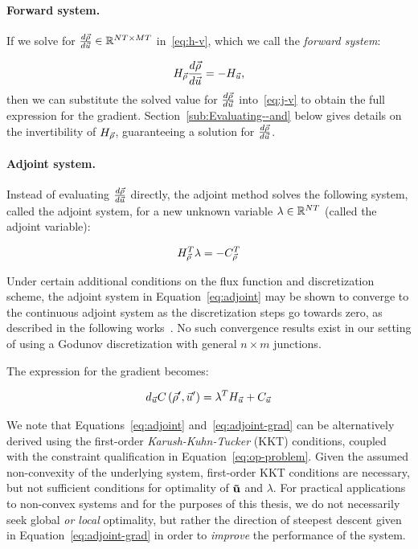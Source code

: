 \paragraph{Forward system.\label{par:Forward-system}}

If we solve for $\frac{d\vec{\rho}}{d\vec{u}}\in\mathbb{R}^{NT\times MT}$
in~\eqref{eq:h-v}, which we call the \emph{forward system}:

\[
H_{\vec{\rho}}\frac{d\vec{\rho}}{d\vec{u}}=-H_{\vec{u}},
\]
then we can substitute the solved value for $\frac{d\vec{\rho}}{d\vec{u}}$
into~\eqref{eq:j-v} to obtain the full expression for the gradient.
Section~\ref{sub:Evaluating--and} below gives details on the invertibility
of $H_{\vec{\rho}}$, guaranteeing a solution for $\frac{d\vec{\rho}}{d\vec{u}}$.


\paragraph{Adjoint system.\label{par:Adjoint-system}}

Instead of evaluating $\frac{d\vec{\rho}}{d\vec{u}}$ directly, the adjoint
method solves the following system, called the adjoint system,
for a new unknown variable $\lambda\in\mathbb{R}^{NT}$
(called the adjoint variable):

\begin{equation}
H_{\vec{\rho}}^{T}\lambda=-C_{\vec{\rho}}^{T}\label{eq:adjoint}
\end{equation}

Under certain additional conditions on the flux function and discretization scheme, the adjoint system in Equation~\eqref{eq:adjoint} may be shown to converge to the continuous adjoint system as the discretization steps go towards zero, as described in the following works~\cite{Banda2012Adjoint,Gugat2005,ulbrich2003adjoint}. No such convergence results exist in our setting of using a Godunov discretization with general $n\times m$ junctions.

The expression for the gradient becomes:

\begin{equation}
d_{\vec{u}}C\left(\vec{\rho}',\vec{u}'\right)=\lambda^{T}H_{\vec{u}}+C_{\vec{u}}\label{eq:adjoint-grad}
\end{equation}

We note that Equations~\eqref{eq:adjoint} and~\eqref{eq:adjoint-grad} can be alternatively derived using the first-order \emph{Karush-Kuhn-Tucker} (KKT) conditions, coupled with the constraint qualification in Equation~\eqref{eq:op-problem}. Given the assumed non-convexity of the underlying system, first-order KKT conditions are necessary, but not sufficient conditions for optimality of $\mathbf{\vec{u}}$ and $\lambda$. For practical applications to non-convex systems and for the purposes of this thesis, we do not necessarily seek global \emph{or local} optimality, but rather the direction of steepest descent given in Equation~\eqref{eq:adjoint-grad} in order to \emph{improve} the performance of the system.

